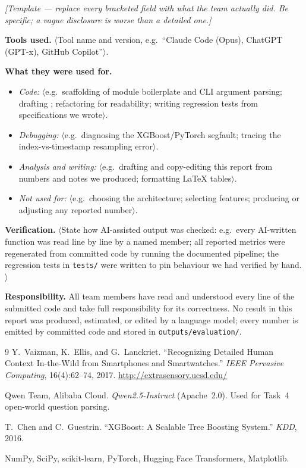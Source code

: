 \documentclass[11pt,a4paper]{article}
\newcommand{\code}[1]{\texttt{\small #1}}
\begin{document}
\noindent\textit{\small [Template --- replace every bracketed field with what the team
actually did. Be specific; a vague disclosure is worse than a detailed one.]}

\vspace{0.5em}
\noindent\textbf{Tools used.} $\langle$Tool name and version, e.g.\ ``Claude Code
(Opus), ChatGPT (GPT-x), GitHub Copilot''$\rangle$.

\vspace{0.4em}
\noindent\textbf{What they were used for.}
\begin{itemize}
\item \emph{Code:} $\langle$e.g.\ scaffolding of module boilerplate and CLI argument
parsing; drafting \code{<names of files or functions>}; refactoring for readability;
writing regression tests from specifications we wrote$\rangle$.
\item \emph{Debugging:} $\langle$e.g.\ diagnosing the XGBoost/PyTorch segfault; tracing
the index-vs-timestamp resampling error$\rangle$.
\item \emph{Analysis and writing:} $\langle$e.g.\ drafting and copy-editing this report
from numbers and notes we produced; formatting LaTeX tables$\rangle$.
\item \emph{Not used for:} $\langle$e.g.\ choosing the architecture; selecting features;
producing or adjusting any reported number$\rangle$.
\end{itemize}

\vspace{0.4em}
\noindent\textbf{Verification.} $\langle$State how AI-assisted output was checked: e.g.\
every AI-written function was read line by line by a named member; all reported metrics
were regenerated from committed code by running the documented pipeline; the regression
tests in \code{tests/} were written to pin behaviour we had verified by hand.$\rangle$

\vspace{0.4em}
\noindent\textbf{Responsibility.} All team members have read and understood every line of
the submitted code and take full responsibility for its correctness. No result in this
report was produced, estimated, or edited by a language model; every number is emitted by
committed code and stored in \code{outputs/evaluation/}.

\begin{thebibliography}{9}
\small
{}
Y.~Vaizman, K.~Ellis, and G.~Lanckriet.
``Recognizing Detailed Human Context In-the-Wild from Smartphones and Smartwatches.''
\emph{IEEE Pervasive Computing}, 16(4):62--74, 2017.
\url{http://extrasensory.ucsd.edu/}

Qwen Team, Alibaba Cloud. \emph{Qwen2.5-Instruct} (Apache~2.0). Used for Task~4
open-world question parsing.

T.~Chen and C.~Guestrin. ``XGBoost: A Scalable Tree Boosting System.''
\emph{KDD}, 2016.

NumPy, SciPy, scikit-learn, PyTorch, Hugging Face Transformers, Matplotlib.
\end{thebibliography}
\end{document}

